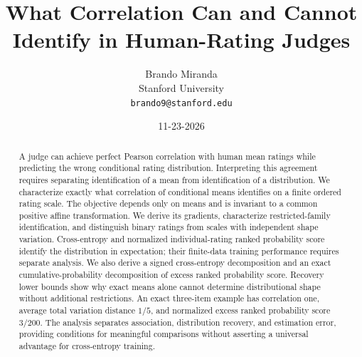 \documentclass[11pt,letterpaper]{article}
\title{What Correlation Can and Cannot Identify in Human-Rating Judges}
\author{Brando Miranda\\Stanford University\\\texttt{brando9@stanford.edu}}
\date{11-23-2026}
\begin{document}
\maketitle
\begin{abstract}
A judge can achieve perfect Pearson correlation with human mean ratings while predicting the wrong conditional rating distribution.
Interpreting this agreement requires separating identification of a mean from identification of a distribution.
We characterize exactly what correlation of conditional means identifies on a finite ordered rating scale.
The objective depends only on means and is invariant to a common positive affine transformation.
We derive its gradients, characterize restricted-family identification, and distinguish binary ratings from scales with independent shape variation.
Cross-entropy and normalized individual-rating ranked probability score identify the distribution in expectation; their finite-data training performance requires separate analysis.
We also derive a signed cross-entropy decomposition and an exact cumulative-probability decomposition of excess ranked probability score.
Recovery lower bounds show why exact means alone cannot determine distributional shape without additional restrictions.
An exact three-item example has correlation one, average total variation distance $1/5$, and normalized excess ranked probability score $3/200$.
The analysis separates association, distribution recovery, and estimation error, providing conditions for meaningful comparisons without asserting a universal advantage for cross-entropy training.
\end{abstract}
\end{document}

